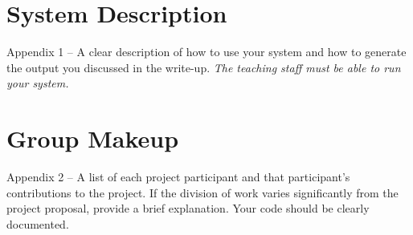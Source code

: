 \documentclass[11pt]{article}
\begin{document}
\iffalse
Summary of approach and results. Major takeaways? Things you could improve in future work?
\fi

\appendix

\section{System Description}

 Appendix 1 – A clear description of how to use your system and how to generate the output you discussed in the write-up. \emph{The teaching staff must be able to run your system.}

\section{Group Makeup}

 Appendix 2 – A list of each project participant and that
participant’s contributions to the project. If the division of work
varies significantly from the project proposal, provide a brief
explanation.  Your code should be clearly documented. 



 

\end{document}
